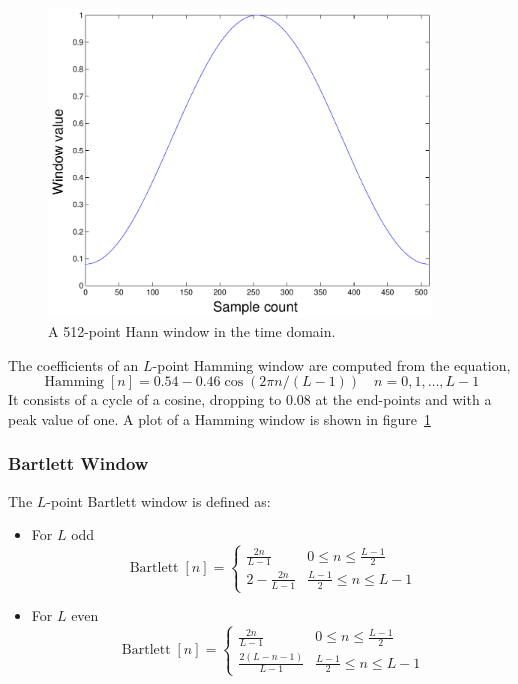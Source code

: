 \begin{figure}
\centerline{\includegraphics[width=4in]{ch-fft/ufft_hamming_w512}}
\caption{A 512-point Hann window in the time domain.\label{fig:ufft-hmw}}
\end{figure}

The
coefficients of an $L$-point Hamming window are computed from the
equation,
\begin{equation}
\operatorname{Hamming}[n]
    = 0.54 - 0.46 \cos(2\pi n/(L-1))
          \quad n=0,1,\ldots,L-1
\label{eq:ufft-hnw}
\end{equation}
It consists of a cycle of a cosine, dropping to 0.08 at the end-points
and with a peak value of one. A plot of a Hamming window is shown in
figure~\ref{fig:ufft-hmw}

\subsubsection{Bartlett Window}

The $L$-point Bartlett window is defined as:

\begin{itemize}
\item For $L$ odd
\begin{equation}
\operatorname{Bartlett}[n]= \left\{\begin{array}{cl}
                        \frac{2n}{L-1}   & 0\le n \le \frac{L-1}{2} \\
                        2-\frac{2n}{L-1} & \frac{L-1}{2}\le n\le L-1
          \end{array}\right.
\end{equation}

\item For $L$ even
\begin{equation}
\operatorname{Bartlett}[n]= \left\{\begin{array}{cl}
                        \frac{2n}{L-1}       & 0\le n \le \frac{L-1}{2} \\
                        \frac{2(L-n-1)}{L-1} & \frac{L-1}{2}\le n\le L-1
          \end{array}\right.
\end{equation}

\end{itemize}


